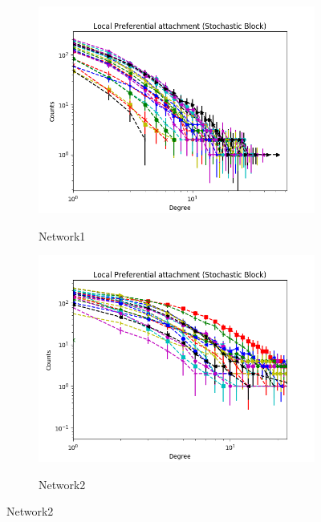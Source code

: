 
\begin{figure}[h]
        \centering
        \begin{subfigure}[b]{0.300\textwidth}
            \centering
            \includegraphics[width=\textwidth]{img/expe/1_ibp/figure_2}
            \label{fig:mean and std of net14}
            \caption {{\small Network1}}    
        \end{subfigure}
        \begin{subfigure}[b]{0.300\textwidth}
            \centering
            \includegraphics[width=\textwidth]{img/expe/2_ibp/figure_2}
            \label{fig:mean and std of net14}
            \caption {{\small Network2}}    
        \end{subfigure}

\end{figure}
